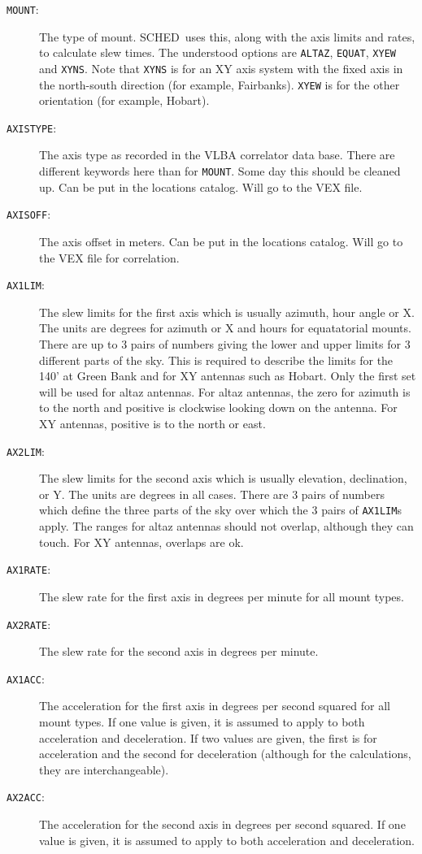 \documentclass{report}
\newcommand{\schedb}{{\sc SCHED~}}
\begin{document}
\begin{description}

\item[{\tt MOUNT}:] The type of mount.  \schedb uses this, along with
the axis limits and rates, to calculate slew times.  The understood
options are {\tt ALTAZ}, {\tt EQUAT}, {\tt XYEW} and {\tt XYNS}.  Note
that {\tt XYNS} is for an XY axis system with the fixed axis in the
north-south direction (for example, Fairbanks).  {\tt XYEW}
is for the other orientation (for example, Hobart).

\item[{\tt AXISTYPE}:] The axis type as recorded in the VLBA
correlator data base.  There are different
keywords here than for {\tt MOUNT}.  Some day this should be cleaned
up.  Can be put in the locations catalog.  Will go to the VEX file.

\item[{\tt AXISOFF}:] The axis offset in meters.  
Can be put in the locations catalog.  Will go to the VEX file for
correlation.

\item [{\tt AX1LIM}:] The slew limits for the first axis which is
usually azimuth, hour angle or X.  The units are degrees for azimuth
or X and hours for equatatorial mounts.  There are up to 3 pairs of
numbers giving the lower and upper limits for 3 different parts of the
sky.  This is required to describe the limits for the 140' at Green
Bank and for XY antennas such as Hobart.  Only the first set will be
used for altaz antennas.  For altaz antennas, the zero for azimuth is
to the north and positive is clockwise looking down on the antenna.
For XY antennas, positive is to the north or east.

\item [{\tt AX2LIM}:] The slew limits for the second axis which is
usually elevation, declination, or Y.  The units are degrees in all
cases.  There are 3 pairs of numbers which define the three parts
of the sky over which the 3 pairs of {\tt AX1LIM}s apply.  The ranges
for altaz antennas should not overlap, although they can touch.  For
XY antennas, overlaps are ok.

\item [{\tt AX1RATE}:] The slew rate for the first axis in degrees
per minute for all mount types.

\item [{\tt AX2RATE}:] The slew rate for the second axis in degrees
per minute.

\item [{\tt AX1ACC}:] The acceleration for the first axis in degrees
per second squared for all mount types.  If one value is given, it is
assumed to apply to both acceleration and deceleration.  If two
values are given, the first is for acceleration and the second for
deceleration (although for the calculations, they are interchangeable).

\item [{\tt AX2ACC}:] The acceleration for the second axis in degrees
per second squared.  If one value is given, it is
assumed to apply to both acceleration and deceleration.

\end{description}
\end{document}
